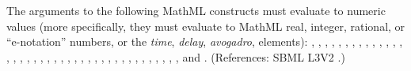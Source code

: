 The arguments to the following MathML constructs must evaluate to numeric
values (more specifically, they must evaluate to MathML real, integer,
rational, or ``e-notation'' numbers, or the \emph{time}, \emph{delay},
\emph{avogadro},   elements): , ,
, , , ,
, , , ,
, , , ,
, , , , ,
, , , , ,
, , , , , , ,
, , , , , , ,
, , and .  (References: SBML L3V2
.)
